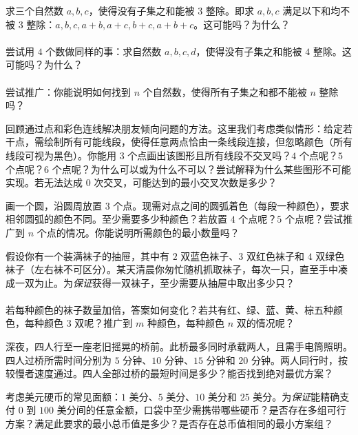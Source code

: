 \begin{exercise}
    求三个自然数 $a,b,c$，使得没有子集之和能被 $3$ 整除。即求 $a,b,c$ 满足以下和均不被 $3$ 整除：$a,b,c,a + b,a + c,b + c,a + b + c$。这可能吗？为什么？\\
    \\
    尝试用 $4$ 个数做同样的事：求自然数 $a,b,c,d$，使得没有子集之和能被 $4$ 整除。这可能吗？为什么？\\
    \\
    尝试推广：你能说明如何找到 $n$ 个自然数，使得所有子集之和都不能被 $n$ 整除吗？
\end{exercise}

\begin{exercise}
    回顾通过点和彩色连线解决朋友倾向问题的方法。这里我们考虑类似情形：给定若干点，需绘制所有可能线段，使得任意两点恰由一条线段连接，但忽略颜色（所有线段可视为黑色）。你能用 $3$ 个点画出该图形且所有线段不交叉吗？$4$ 个点呢？$5$ 个点呢？$6$ 个点呢？为什么可以或为什么不可以？尝试解释为什么某些图形不可能实现。若无法达成 $0$ 次交叉，可能达到的最小交叉次数是多少？
\end{exercise}

\begin{exercise}
    画一个圆，沿圆周放置 $3$ 个点。现需对点之间的圆弧着色（每段一种颜色），要求相邻圆弧的颜色不同。至少需要多少种颜色？若放置 $4$ 个点呢？$5$ 个点呢？尝试推广到 $n$ 个点的情况。你能说明所需颜色的最小数量吗？
\end{exercise}

\begin{exercise}
    假设你有一个装满袜子的抽屉，其中有 $2$ 双蓝色袜子、$3$ 双红色袜子和 $4$ 双绿色袜子（左右袜不可区分）。某天清晨你匆忙随机抓取袜子，每次一只，直至手中凑成一双为止。为\emph{保证}获得一双袜子，至少需要从抽屉中取出多少只？\\
    \\
    若每种颜色的袜子数量加倍，答案如何变化？若共有红、绿、蓝、黄、棕五种颜色，每种颜色 $3$ 双呢？推广到 $m$ 种颜色，每种颜色 $n$ 双的情况呢？
\end{exercise}

\begin{exercise}
    深夜，四人行至一座老旧摇晃的桥前。此桥最多同时承载两人，且需手电筒照明。四人过桥所需时间分别为 $5$ 分钟、$10$ 分钟、$15$ 分钟和 $20$ 分钟。两人同行时，按较慢者速度通过。四人全部过桥的最短时间是多少？能否找到绝对最优方案？
\end{exercise}

\begin{exercise}
    考虑美元硬币的常见面额：$1$ 美分、$5$ 美分、$10$ 美分和 $25$ 美分。为\emph{保证}能精确支付 $0$ 到 $100$ 美分间的任意金额，口袋中至少需携带哪些硬币？是否存在多组可行方案？满足此要求的最小总币值是多少？是否存在总币值相同的最小方案组？
\end{exercise}

